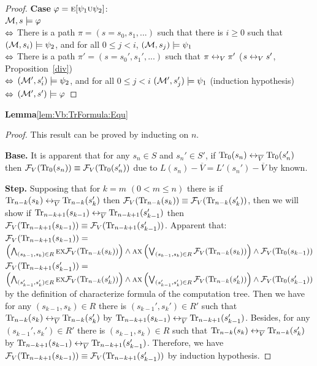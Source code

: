 \documentclass{article}
\begin{document}
\begin{proof}
\textbf{Case} $\varphi = \textsc{e} [\psi_1 \textsc{u} \psi_2]$:\\
${\cal M}, s \models \varphi$ \\
$\Leftrightarrow$ There is a path $\pi= (s=s_0, s_1, ...)$ such that there is $i \geq 0$ such that $({\cal M}, s_i) \models \psi_2$, and for all $0 \leq j < i$, $({\cal M}, s_j) \models \psi_1$\\
$\Leftrightarrow$ There is a path $\pi' = (s=s_0', s_1', ...)$ such that $\pi \leftrightarrow_V \pi'$  \hfill  ($s \leftrightarrow_V s'$, Proposition~\ref{div})\\
$\Leftrightarrow$ $({\cal M}', s_i') \models \psi_2$, and for all $0 \leq j < i$ $({\cal M}', s_j') \models \psi_1$   \hfill   (induction hypothesis)\\
$\Leftrightarrow$ $({\cal M}', s') \models \varphi$
\end{proof}



\textbf{Lemma}\ref{lem:Vb:TrFormula:Equ}
\begin{proof}
This result can be proved by inducting on $n$.

\textbf{Base.} It is apparent that for any $s_n\in S$ and $s_n' \in S'$, if $\textrm{Tr}_0(s_n) \leftrightarrow_{\overline V} \textrm{Tr}_0(s_n')$ then ${\cal F}_V(\textrm{Tr}_0(s_n)) \equiv {\cal F}_V(\textrm{Tr}_0(s_n'))$ due to $L(s_n) - \overline V = L'(s_n') - \overline V$ by known.

\textbf{Step.} Supposing that for $k=m$ $(0< m \leq n)$ there is if $\textrm{Tr}_{n-k}(s_k) \leftrightarrow_{\overline V} \textrm{Tr}_{n-k}(s_k')$ then ${\cal F}_V(\textrm{Tr}_{n-k}(s_k)) \equiv {\cal F}_V(\textrm{Tr}_{n-k}(s_k'))$, then we will show if $\textrm{Tr}_{n-k+1}(s_{k-1}) \leftrightarrow_{\overline V} \textrm{Tr}_{n-k+1}(s_{k-1}')$ then ${\cal F}_V(\textrm{Tr}_{n-k+1}(s_{k-1})) \equiv {\cal F}_V(\textrm{Tr}_{n-k+1}(s_{k-1}'))$. Apparent that:\\
 ${\cal F}_V(\textrm{Tr}_{n-k+1}(s_{k-1})) =$ \\
 $\left(\bigwedge_{(s_{k-1},s_k)\in R}
    \textsc{e} \textsc{x} {\cal F}_V(\textrm{Tr}_{n-k}(s_k))\right)
    \wedge \textsc{a} \textsc{x}\left(\bigvee_{(s_{k-1},s_k)\in R}
    {\cal F}_V(\textrm{Tr}_{n-k}(s_k) )\right)
    \wedge {\cal F}_V(\textrm{Tr}_0(s_{k-1}))$\\
 ${\cal F}_V(\textrm{Tr}_{n-k+1}(s_{k-1}')) =$ \\
 $\left(\bigwedge_{(s_{k-1}',s_k')\in R}
    \textsc{e} \textsc{x} {\cal F}_V(\textrm{Tr}_{n-k}(s_k'))\right)
    \wedge \textsc{a} \textsc{x}\left(\bigvee_{(s_{k-1}',s_k')\in R}
    {\cal F}_V(\textrm{Tr}_{n-k}(s_k') )\right)
    \wedge {\cal F}_V(\textrm{Tr}_0(s_{k-1}'))$ by the definition of characterize formula of the computation tree.
 Then we have for any $(s_{k-1}, s_k) \in R$ there is $(s_{k-1}', s_k') \in R'$ such that $\textrm{Tr}_{n-k}(s_k) \leftrightarrow_{\overline V} \textrm{Tr}_{n-k}(s_k')$ by $\textrm{Tr}_{n-k+1}(s_{k-1}) \leftrightarrow_{\overline V} \textrm{Tr}_{n-k+1}(s_{k-1}')$. Besides, for any $(s_{k-1}', s_k') \in R'$ there is $(s_{k-1}, s_k) \in R$ such that $\textrm{Tr}_{n-k}(s_k) \leftrightarrow_{\overline V} \textrm{Tr}_{n-k}(s_k')$ by $\textrm{Tr}_{n-k+1}(s_{k-1}) \leftrightarrow_{\overline V} \textrm{Tr}_{n-k+1}(s_{k-1}')$.
 Therefore, we have ${\cal F}_V(\textrm{Tr}_{n-k+1}(s_{k-1})) \equiv {\cal F}_V(\textrm{Tr}_{n-k+1}(s_{k-1}'))$ by induction hypothesis.
\end{proof}
\end{document}
